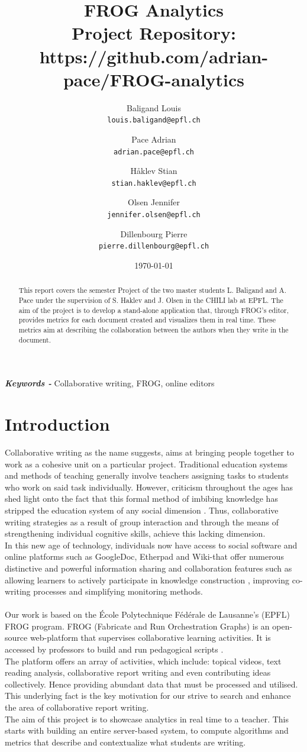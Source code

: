 \documentclass[a4, twocolumn, 12pt]{article}
\title{FROG Analytics \\
\large  Project Repository: https://github.com/adrian-pace/FROG-analytics}
\author{
Baligand Louis\\
\texttt{louis.baligand@epfl.ch}
\and
Pace Adrian\\
\texttt{adrian.pace@epfl.ch}
\and
Håklev Stian\\
\texttt{stian.haklev@epfl.ch}
\and
Olsen Jennifer\\
\texttt{jennifer.olsen@epfl.ch}
\and
Dillenbourg Pierre\\
\texttt{pierre.dillenbourg@epfl.ch}}
\date{\today}
\providecommand{\keywords}[1]{\textbf{\textit{Keywords - }} #1}
\begin{document}
\maketitle
   
\begin{abstract}
This report covers the semester Project of the two master students L. Baligand and A. Pace under the supervision of S. Haklev and J. Olsen in the CHILI lab at EPFL. The aim of the project is to develop a stand-alone application that, through FROG's editor,   provides metrics for each document created and visualizes them in real time. These metrics aim at describing the collaboration between the authors when they write in the document.
\end{abstract}

\keywords{Collaborative writing, FROG, online editors}

\section{Introduction}
Collaborative writing as the name suggests, aims at bringing people together to work as a cohesive unit on a particular project. Traditional education systems and methods of teaching generally involve teachers assigning tasks to students who work on said task individually. However, criticism throughout the ages has shed light onto the fact that this formal method of imbibing knowledge has stripped the education system of any social dimension \cite{Bornstein}. Thus, collaborative writing strategies as a result of group interaction and through the means of strengthening individual cognitive skills, achieve this lacking dimension. 
\\
In this new age of technology, individuals now have access to social software and online platforms such as GoogleDoc, Etherpad and Wiki-that offer numerous distinctive and powerful information sharing and collaboration features such as allowing learners to actively participate in knowledge construction \cite{boulos}, improving co-writing processes and simplifying monitoring methods. 
 \\
 \\
Our work is based on the École Polytechnique Fédérale de Lausanne’s (EPFL) FROG program. FROG (Fabricate and Run Orchestration Graphs) is an open-source web-platform that supervises collaborative learning activities. It is accessed by professors to build and run pedagogical scripts \cite{haklev}.\\
The platform offers an array of activities, which include: topical videos, text reading analysis, collaborative report writing and even contributing ideas collectively. Hence providing abundant data that must be processed and utilised. This underlying fact is the key motivation for our strive to search and enhance the area of collaborative report writing.
\\
The aim of this project is to showcase analytics in real time to a teacher. This starts with building an entire server-based system, to compute algorithms and metrics that describe and contextualize what students are writing.
\end{document}
